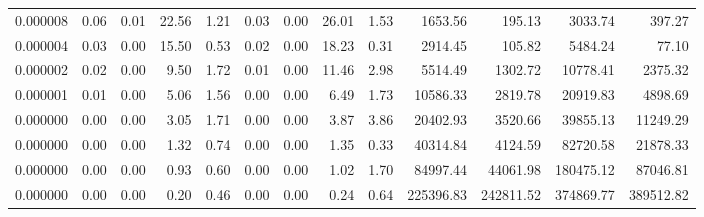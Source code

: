 \begin{tabular}{lrrrrrrrrrrrr}
0.000008 & 0.06 & 0.01 & 22.56 & 1.21 & 0.03 & 0.00 & 26.01 & 1.53 & 1653.56 & 195.13 & 3033.74 & 397.27 \\
0.000004 & 0.03 & 0.00 & 15.50 & 0.53 & 0.02 & 0.00 & 18.23 & 0.31 & 2914.45 & 105.82 & 5484.24 & 77.10 \\
0.000002 & 0.02 & 0.00 & 9.50 & 1.72 & 0.01 & 0.00 & 11.46 & 2.98 & 5514.49 & 1302.72 & 10778.41 & 2375.32 \\
0.000001 & 0.01 & 0.00 & 5.06 & 1.56 & 0.00 & 0.00 & 6.49 & 1.73 & 10586.33 & 2819.78 & 20919.83 & 4898.69 \\
0.000000 & 0.00 & 0.00 & 3.05 & 1.71 & 0.00 & 0.00 & 3.87 & 3.86 & 20402.93 & 3520.66 & 39855.13 & 11249.29 \\
0.000000 & 0.00 & 0.00 & 1.32 & 0.74 & 0.00 & 0.00 & 1.35 & 0.33 & 40314.84 & 4124.59 & 82720.58 & 21878.33 \\
0.000000 & 0.00 & 0.00 & 0.93 & 0.60 & 0.00 & 0.00 & 1.02 & 1.70 & 84997.44 & 44061.98 & 180475.12 & 87046.81 \\
0.000000 & 0.00 & 0.00 & 0.20 & 0.46 & 0.00 & 0.00 & 0.24 & 0.64 & 225396.83 & 242811.52 & 374869.77 & 389512.82 \\
\bottomrule
\end{tabular}
